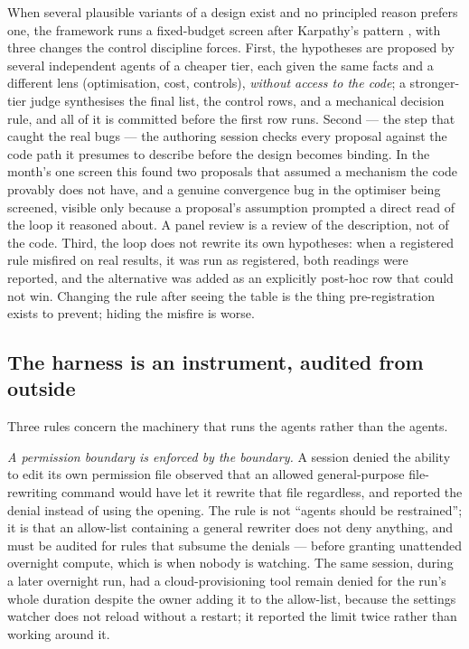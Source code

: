 \documentclass[11pt]{article}
\begin{document}
When several plausible variants of a design exist and no principled reason prefers one, the
framework runs a fixed-budget screen after Karpathy's pattern \cite{karpathy2026}, with three
changes the control discipline forces. First, the hypotheses are proposed by several independent
agents of a cheaper tier, each given the same facts and a different lens (optimisation, cost,
controls), \emph{without access to the code}; a stronger-tier judge synthesises the final list,
the control rows, and a mechanical decision rule, and all of it is committed before the first
row runs. Second --- the step that caught the real bugs --- the authoring session checks every
proposal against the code path it presumes to describe before the design becomes binding. In the
month's one screen this found two proposals that assumed a mechanism the code provably does not
have, and a genuine convergence bug in the optimiser being screened, visible only because a
proposal's assumption prompted a direct read of the loop it reasoned about. A panel review is a
review of the description, not of the code. Third, the loop does not rewrite its own hypotheses:
when a registered rule misfired on real results, it was run as registered, both readings were
reported, and the alternative was added as an explicitly post-hoc row that could not win.
Changing the rule after seeing the table is the thing pre-registration exists to prevent; hiding
the misfire is worse.

\subsection{The harness is an instrument, audited from outside}

Three rules concern the machinery that runs the agents rather than the agents.

\emph{A permission boundary is enforced by the boundary.} A session denied the ability to edit
its own permission file observed that an allowed general-purpose file-rewriting command would
have let it rewrite that file regardless, and reported the denial instead of using the opening.
The rule is not ``agents should be restrained''; it is that an allow-list containing a general
rewriter does not deny anything, and must be audited for rules that subsume the denials ---
before granting unattended overnight compute, which is when nobody is watching. The same
session, during a later overnight run, had a cloud-provisioning tool remain denied for the
run's whole duration despite the owner adding it to the allow-list, because the settings
watcher does not reload without a restart; it reported the limit twice rather than working
around it.
\end{document}
